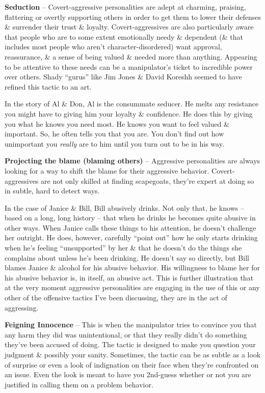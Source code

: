 \documentclass{article}
\numberwithin{equation}{section}
\begin{document}
\textbf{Seduction} -- Covert-aggressive personalities are adept at charming, praising, flattering or overtly supporting others in order to get them to lower their defenses \& surrender their trust \& loyalty. Covert-aggressives are also particularly aware that people who are to some extent emotionally needy \& dependent (\& that includes most people who aren't character-disordered) want approval, reassurance, \& a sense of being valued \& needed more than anything. Appearing to be attentive to these needs can be a manipulator's ticket to incredible power over others. Shady ``gurus'' like Jim Jones \& David Koreshh seemed to have refined this tactic to an art.

In the story of Al \& Don, Al is the consummate seducer. He melts any resistance you might have to giving him your loyalty \& confidence. He does this by giving you what he knows you need most. He knows you want to feel valued \& important. So, he often tells you that you are. You don't find out how unimportant you \textit{really} are to him until you turn out to be in his way.

\textbf{Projecting the blame (blaming others)} -- Aggressive personalities are always looking for a way to shift the blame for their aggressive behavior. Covert-aggressives are not only skilled at finding scapegoats, they're expert at doing so in subtle, hard to detect ways.

In the case of Janice \& Bill, Bill abusively drinks. Not only that, he knows -- based on a long, long history -- that when he drinks he becomes quite abusive in other ways. When Janice calls these things to his attention, he doesn't challenge her outright. He does, however, carefully ``point out'' how he only starts drinking when he's feeling ``unsupported'' by her \& that he doesn't do the things she complains about unless he's been drinking. He doesn't say so directly, but Bill blames Janice \& alcohol for his abusive behavior. His willingness to blame her for his abusive behavior is, in itself, an abusive act. This is further illustration that at the very moment aggressive personalities are engaging in the use of this or any other of the offensive tactics I've been discussing, they are in the act of aggressing.

\textbf{Feigning Innocence} -- This is when the manipulator tries to convince you that any harm they did was unintentional, or that they really didn't do something they've been accused of doing. The tactic is designed to make you question your judgment \& possibly your sanity. Sometimes, the tactic can be as subtle as a look of surprise or even a look of indignation on their face when they're confronted on an issue. Even the look is meant to have you 2nd-guess whether or not you are justified in calling them on a problem behavior.
\end{document}

